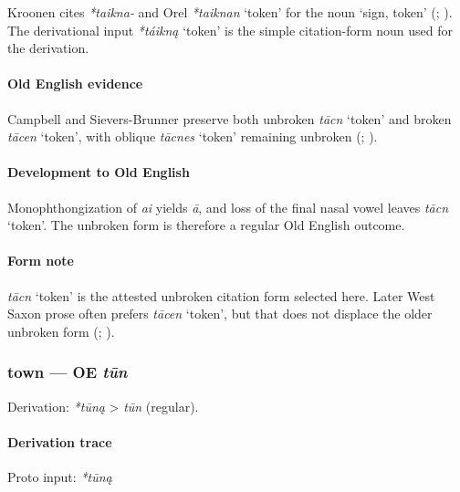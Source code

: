 \documentclass[
  british,
  a4paper,
]{article}
\providecommand{\Recon}[1]{\emph{*#1}}
\begin{document}
Kroonen cites \emph{*taikna-} and Orel \Recon{taiknan} `token' for the
noun `sign, token' (;
). The derivational input
\Recon{táikną} `token' is the simple citation-form noun used for the
derivation.

\paragraph{Old English evidence}\label{old-english-evidence-70}

Campbell and Sievers-Brunner preserve both unbroken \emph{tācn} `token'
and broken \emph{tācen} `token', with oblique \emph{tācnes} `token'
remaining unbroken (;
).

\paragraph{Development to Old
English}\label{development-to-old-english-69}

Monophthongization of \emph{ai} yields \emph{ā}, and loss of the final
nasal vowel leaves \emph{tācn} `token'. The unbroken form is therefore a
regular Old English outcome.

\paragraph{Form note}\label{form-note-22}

\emph{tācn} `token' is the attested unbroken citation form selected
here. Later West Saxon prose often prefers \emph{tācen} `token', but
that does not displace the older unbroken form
(;
).

\subsubsection{\texorpdfstring{town --- OE
\emph{tūn}}{town --- OE tūn}}\label{town-oe-tux16bn}

Derivation: \emph{*tūną} \textgreater{} \emph{tūn} (regular).

\paragraph{Derivation trace}\label{derivation-trace-88}

Proto input: \emph{*tūną}
\end{document}
